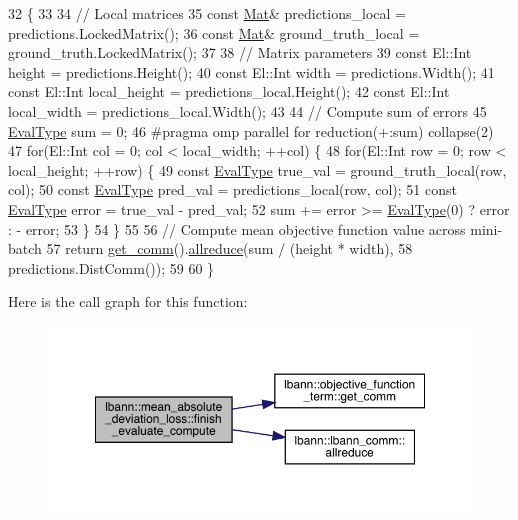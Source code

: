 \begin{DoxyCode}
32                                                                  \{
33 
34   \textcolor{comment}{// Local matrices}
35   \textcolor{keyword}{const} \hyperlink{base_8hpp_a68f11fdc31b62516cb310831bbe54d73}{Mat}& predictions\_local = predictions.LockedMatrix();
36   \textcolor{keyword}{const} \hyperlink{base_8hpp_a68f11fdc31b62516cb310831bbe54d73}{Mat}& ground\_truth\_local = ground\_truth.LockedMatrix();
37 
38   \textcolor{comment}{// Matrix parameters}
39   \textcolor{keyword}{const} El::Int height = predictions.Height();
40   \textcolor{keyword}{const} El::Int width = predictions.Width();
41   \textcolor{keyword}{const} El::Int local\_height = predictions\_local.Height();
42   \textcolor{keyword}{const} El::Int local\_width = predictions\_local.Width();
43 
44   \textcolor{comment}{// Compute sum of errors}
45   \hyperlink{base_8hpp_a3266f5ac18504bbadea983c109566867}{EvalType} sum = 0;
46 \textcolor{preprocessor}{  #pragma omp parallel for reduction(+:sum) collapse(2)}
47   \textcolor{keywordflow}{for}(El::Int col = 0; col < local\_width; ++col) \{
48     \textcolor{keywordflow}{for}(El::Int row = 0; row < local\_height; ++row) \{
49       \textcolor{keyword}{const} \hyperlink{base_8hpp_a3266f5ac18504bbadea983c109566867}{EvalType} true\_val = ground\_truth\_local(row, col);
50       \textcolor{keyword}{const} \hyperlink{base_8hpp_a3266f5ac18504bbadea983c109566867}{EvalType} pred\_val = predictions\_local(row, col);
51       \textcolor{keyword}{const} \hyperlink{base_8hpp_a3266f5ac18504bbadea983c109566867}{EvalType} error = true\_val - pred\_val;
52       sum += error >= \hyperlink{base_8hpp_a3266f5ac18504bbadea983c109566867}{EvalType}(0) ? error : - error;
53     \}
54   \}
55   
56   \textcolor{comment}{// Compute mean objective function value across mini-batch}
57   \textcolor{keywordflow}{return} \hyperlink{classlbann_1_1objective__function__term_a5f89b676a26a6b76ddc26563ac87beb9}{get\_comm}().\hyperlink{classlbann_1_1lbann__comm_af5631e5f0f54e4df4958eba9df2599ef}{allreduce}(sum / (height * width),
58                               predictions.DistComm());
59 
60 \}
\end{DoxyCode}
Here is the call graph for this function\+:\nopagebreak
\begin{figure}[H]
\begin{center}
\leavevmode
\includegraphics[width=350pt]{classlbann_1_1mean__absolute__deviation__loss_ab0a19f6393ef5df9275f1ed4802e8cf6_cgraph}
\end{center}
\end{figure}
